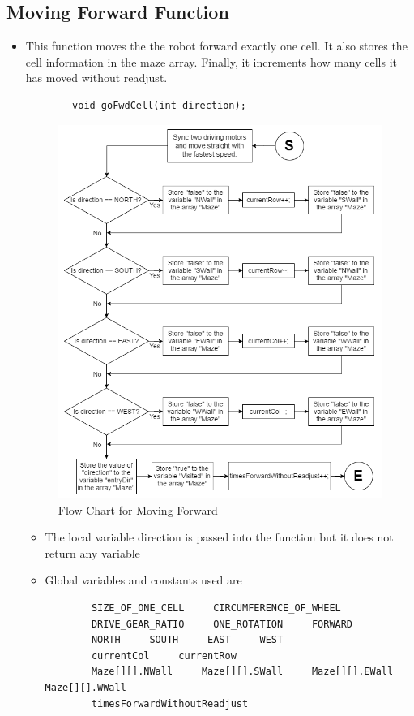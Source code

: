 \documentclass[11pt]{article}
\begin{document}

\subsection{Moving Forward Function}
\begin{itemize}
\item This function moves the the robot forward exactly one cell. It also stores the cell information in the maze array. Finally, it increments how many cells it has moved without readjust. 
	\begin{verbatim}
		void goFwdCell(int direction);
	\end{verbatim}
\begin{figure}[htp]
\centering
\includegraphics[scale=0.52]{images/Software_Flowchart/Moving_Forward.png}
\caption{Flow Chart for Moving Forward}
\label{}
\end{figure}	
	\begin{itemize}
	\item The local variable direction is passed into the function but it does not return any variable
	\item Global variables and constants used are
	\begin{verbatim}
		SIZE_OF_ONE_CELL     CIRCUMFERENCE_OF_WHEEL
		DRIVE_GEAR_RATIO     ONE_ROTATION     FORWARD
		NORTH     SOUTH     EAST     WEST
		currentCol     currentRow
		Maze[][].NWall     Maze[][].SWall     Maze[][].EWall     Maze[][].WWall
		timesForwardWithoutReadjust
	\end{verbatim}
	\end{itemize}
\end{itemize}
\newpage
\end{document}
